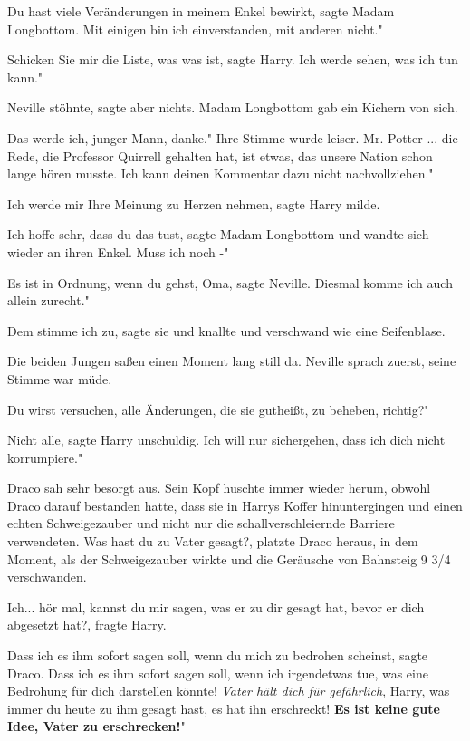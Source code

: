 \glqq{}Du hast viele Veränderungen in meinem Enkel bewirkt\grqq{}, sagte Madam
Longbottom. \glqq{}Mit einigen bin ich einverstanden, mit anderen nicht."

\glqq{}Schicken Sie mir die Liste, was was ist\grqq{}, sagte Harry. \glqq{}Ich
werde sehen, was ich tun kann."

Neville stöhnte, sagte aber nichts. Madam Longbottom gab ein Kichern von sich.

\glqq{}Das werde ich, junger Mann, danke." Ihre Stimme wurde leiser. \glqq{}Mr.
Potter ... die Rede, die Professor Quirrell gehalten hat, ist etwas, das unsere
Nation schon lange hören musste. Ich kann deinen Kommentar dazu nicht
nachvollziehen."

\glqq{}Ich werde mir Ihre Meinung zu Herzen nehmen\grqq{}, sagte Harry milde.

\glqq{}Ich hoffe sehr, dass du das tust\grqq{}, sagte Madam Longbottom und
wandte sich wieder an ihren Enkel. \glqq{}Muss ich noch -"

\glqq{}Es ist in Ordnung, wenn du gehst, Oma\grqq{}, sagte Neville.
\glqq{}Diesmal komme ich auch allein zurecht."

\glqq{}Dem stimme ich zu\grqq{}, sagte sie und knallte und verschwand wie eine
Seifenblase.

Die beiden Jungen saßen einen Moment lang still da. Neville sprach zuerst, seine
Stimme war müde.

\glqq{}Du wirst versuchen, alle Änderungen, die sie gutheißt, zu beheben,
richtig?"

\glqq{}Nicht alle\grqq{}, sagte Harry unschuldig. \glqq{}Ich will nur
sichergehen, dass ich dich nicht korrumpiere."

Draco sah sehr besorgt aus. Sein Kopf huschte immer wieder herum, obwohl Draco
darauf bestanden hatte, dass sie in Harrys Koffer hinuntergingen und einen
echten Schweigezauber und nicht nur die schallverschleiernde Barriere
verwendeten. \glqq{}Was hast du zu Vater gesagt?\grqq{}, platzte Draco heraus,
in dem Moment, als der Schweigezauber wirkte und die Geräusche von Bahnsteig 9
3/4 verschwanden.

\glqq{}Ich... hör mal, kannst du mir sagen, was er zu dir gesagt hat, bevor er
dich abgesetzt hat?\grqq{}, fragte Harry.

\glqq{}Dass ich es ihm sofort sagen soll, wenn du mich zu bedrohen
scheinst\grqq{}, sagte Draco. \glqq{}Dass ich es ihm sofort sagen soll, wenn ich
irgendetwas tue, was eine Bedrohung für dich darstellen könnte! \emph{Vater hält
dich für gefährlich}, Harry, was immer du heute zu ihm gesagt hast, es hat ihn
erschreckt! \textbf{Es ist keine gute Idee, Vater zu erschrecken!}"

